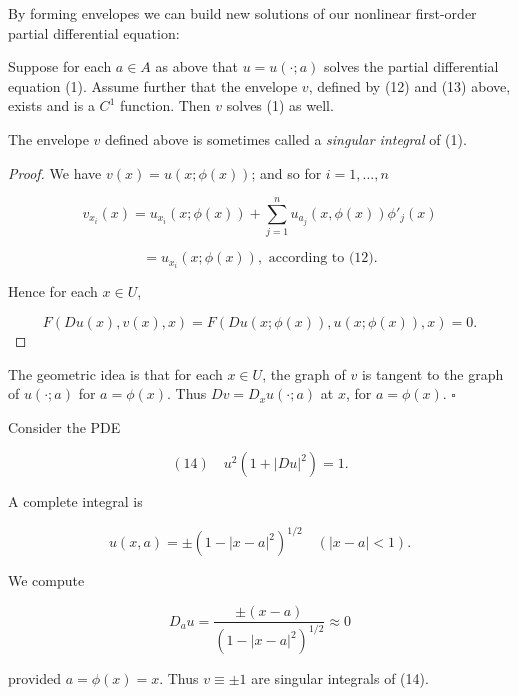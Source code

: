 By forming envelopes we can build new solutions of our nonlinear first-order partial differential equation:

\begin{theorem}
\label{thm:envelope-solves-pde}
Suppose for each $a \in A$ as above that $u = u(\cdot; a)$ solves the partial differential equation (1). Assume further that the envelope $v$, defined by (12) and (13) above, exists and is a $C^1$ function. Then $v$ solves (1) as well.

The envelope $v$ defined above is sometimes called a \textit{singular integral} of (1).
\end{theorem}

\begin{proof}
We have $v(x) = u(x; \phi(x))$; and so for $i = 1, \ldots, n$

$$v_{x_i}(x) = u_{x_i}(x; \phi(x)) + \sum_{j=1}^n u_{a_j}(x, \phi(x)) \phi'_j(x)$$

$$= u_{x_i}(x; \phi(x)), \text{ according to (12).}$$

Hence for each $x \in U$,

$$F(Du(x), v(x), x) = F(Du(x; \phi(x)), u(x; \phi(x)), x) = 0.$$
\end{proof}

\begin{remark}
\label{rem:envelope-tangency}
The geometric idea is that for each $x \in U$, the graph of $v$ is tangent to the graph of $u(\cdot; a)$ for $a = \phi(x)$. Thus $Dv = D_x u(\cdot; a)$ at $x$, for $a = \phi(x)$. $\square$
\end{remark}

\begin{example}[Envelope of a complete integral for $u^2(1+|Du|^2)=1$]
\label{ex:envelope-singular-integral}
Consider the PDE

$$(14) \quad u^2(1 + |Du|^2) = 1.$$

A complete integral is

$$u(x, a) = \pm(1 - |x - a|^2)^{1/2} \quad (|x - a| < 1).$$

We compute

$$D_a u = \frac{\pm(x - a)}{(1 - |x - a|^2)^{1/2}} \approx 0$$

provided $a = \phi(x) = x$. Thus $v \equiv \pm 1$ are singular integrals of (14).
\end{example}


